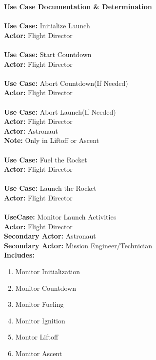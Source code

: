 \documentclass[letterpaper]{article}
\begin{document}
\noindent
\textbf{Use Case Documentation \& Determination}\\\\
\textbf{Use Case:  }Initialize Launch\\
\textbf{Actor:  }Flight Director\\\\
\textbf{Use Case: }Start Countdown\\
\textbf{Actor: }Flight Director\\\\
\textbf{Use Case: }Abort Countdown(If Needed)\\
\textbf{Actor: }Flight Director\\\\
\textbf{Use Case: }Abort Launch(If Needed)\\
\textbf{Actor: }Flight Director\\
\textbf{Actor: }Astronaut\\
\textbf{Note: }Only in Liftoff or Ascent\\\\
\textbf{Use Case: }Fuel the Rocket\\
\textbf{Actor: }Flight Director\\\\
\textbf{Use Case: }Launch the Rocket\\
\textbf{Actor: }Flight Director\\\\
\textbf{UseCase: }Monitor Launch Activities\\
\textbf{Actor: }Flight Director\\
\textbf{Secondary Actor: }Astronaut\\
\textbf{Secondary Actor: }Mission Engineer/Technician\\
\textbf{Includes: }
\begin{enumerate}
   \item Monitor Initialization
   \item Monitor Countdown
   \item Monitor Fueling
   \item Monitor Ignition
   \item Montor  Liftoff
   \item Monitor Ascent
\end{enumerate}
\end{document}
